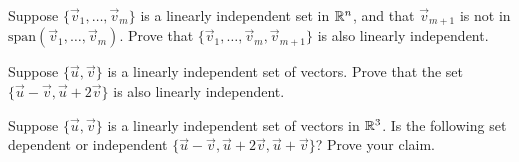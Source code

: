 \documentclass{ximera}
\begin{document}
\begin{problem}\label{prob:linindmultchoice10}
\begin{multipleChoice}
 \end{multipleChoice}
\begin{center}
\end{center}
\end{problem}


\begin{problem}\label{prob:Adding1OK}
Suppose $\{\vec{v}_{1}, \dots , \vec{v}_{m}\}$ is a linearly independent set in $\mathbb{R}^n$, and that $\vec{v}_{m+1}$ is not in $\mbox{span}\left(\vec{v}_{1}, \dots , \vec{v}_{m}\right)$.  Prove that $\{\vec{v}_{1}, \dots , \vec{v}_{m}, \vec{v}_{m+1}\}$ is also linearly independent.
\end{problem}

\begin{problem}\label{prob:OtherLinearComb}
Suppose $\{{\vec{u}},{\vec{v}}\}$ is a linearly independent set of vectors.  Prove that the set $\{\vec{u} -\vec{v}, \vec{u}+2\vec{v}\}$ is also linearly independent.
\end{problem}

\begin{problem}\label{prob:OtherLinearComb2}
Suppose $\{{\vec{u}},{\vec{v}}\}$ is a linearly independent set of vectors in $\mathbb{R}^3$.  Is the following set dependent or independent $\{\vec{u} -\vec{v}, \vec{u}+2\vec{v}, \vec{u}+\vec{v}\}$? Prove your claim.
\end{problem}
\end{document}
